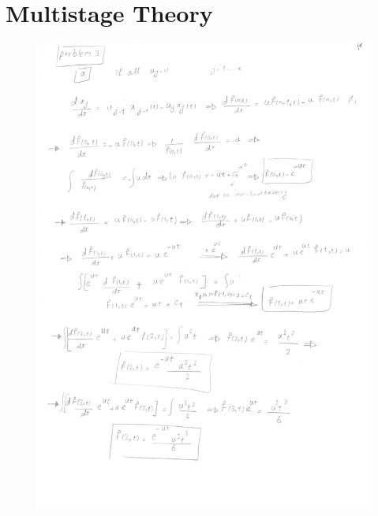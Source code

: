 \section{Multistage Theory}
\begin{figure}[htbp]
\centering
\includegraphics[scale=0.8, page=1]{./img/ex3}
\end{figure}
